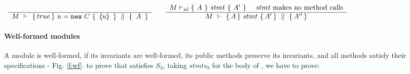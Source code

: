 \small
$
\begin{array}{lcl}
\inferruleNoName 
	{ 
	 	
	}  	 
	{	 
 	\hprovesN  {M}  
	                {  true  }  
 			   {\  u = \prg{new}\ C \ }
 			   {\  \inside{u}\  }  { \ A \ }
	}
	& &
\inferruleNoName 
	{  
	  M \vdash_{ul} \{ \ A\ \} {\ stmt\ }\{\ A'\ \}   \ \ \ \ stmt\  \mbox{makes no method calls}
	}
	{\hprovesN{M}  {A} {\ stmt \ } {A'} {A''} } 
\end{array}
$
\normalsize

\paragraph{Well-formed modules} A module is well-formed, if  its invariants are well-formed,    its public methods preserve   its invariants, and  all  methods satisfy their specifications - \cf  Fig.  \ref{f:wf}.
%
%
%
\Eg to prove  that   satisfies {$S_3$}, taking   $stmts_{b}$ %
for the    body of ,  we  have to prove:
\\
